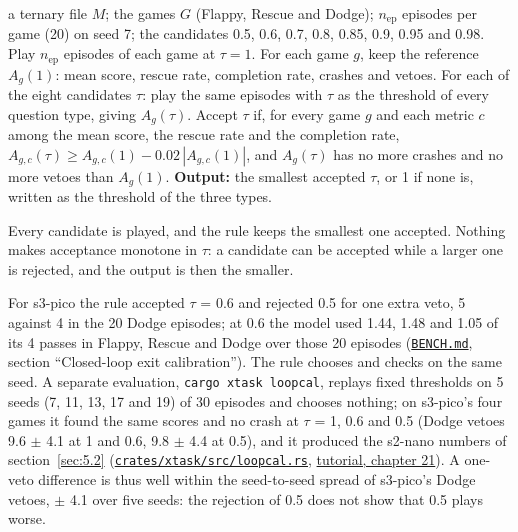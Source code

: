 \documentclass[10pt]{article}
\begin{document}
\begin{algorithm}[htbp]
\caption{Closed-loop exit calibration as implemented.}\label{alg:2}
\begin{algorithmic}[1]
\Require a ternary file $M$; the games $G$ (Flappy, Rescue and Dodge); $n_{\mathrm{ep}}$ episodes per game (20) on seed 7; the candidates 0.5, 0.6, 0.7, 0.8, 0.85, 0.9, 0.95 and 0.98.
\State Play $n_{\mathrm{ep}}$ episodes of each game at $\tau = 1$. For each game $g$, keep the reference $A_g(1)$: mean score, rescue rate, completion rate, crashes and vetoes.
\State For each of the eight candidates $\tau$: play the same episodes with $\tau$ as the threshold of every question type, giving $A_g(\tau)$.
\State Accept $\tau$ if, for every game $g$ and each metric $c$ among the mean score, the rescue rate and the completion rate, $A_{g,c}(\tau) \geq A_{g,c}(1) - 0.02\,|A_{g,c}(1)|$, and $A_g(\tau)$ has no more crashes and no more vetoes than $A_g(1)$.
\State \textbf{Output:} the smallest accepted $\tau$, or 1 if none is, written as the threshold of the three types.
\end{algorithmic}
\end{algorithm}

Every candidate is played, and the rule keeps the smallest one accepted. Nothing makes acceptance monotone in $\tau$: a candidate can be accepted while a larger one is rejected, and the output is then the smaller.

For s3-pico the rule accepted $\tau$ = 0.6 and rejected 0.5 for one extra veto, 5 against 4 in the 20 Dodge episodes; at 0.6 the model used 1.44, 1.48 and 1.05 of its 4 passes in Flappy, Rescue and Dodge over those 20 episodes (\href{https://github.com/maxgfr/skycmd/blob/main/BENCH.md}{\texttt{BENCH.md}}, section ``Closed-loop exit calibration''). The rule chooses and checks on the same seed. A separate evaluation, \texttt{cargo xtask loopcal}, replays fixed thresholds on 5 seeds (7, 11, 13, 17 and 19) of 30 episodes and chooses nothing; on s3-pico's four games it found the same scores and no crash at $\tau$ = 1, 0.6 and 0.5 (Dodge vetoes 9.6 $\pm$ 4.1 at 1 and 0.6, 9.8 $\pm$ 4.4 at 0.5), and it produced the s2-nano numbers of section~\ref{sec:5.2} (\href{https://github.com/maxgfr/skycmd/blob/main/crates/xtask/src/loopcal.rs}{\texttt{crates/\allowbreak{}xtask/\allowbreak{}src/\allowbreak{}loopcal.rs}}, \href{https://maxgfr.github.io/skycmd/tutorial/21-s3-recursive-tiny}{tutorial, chapter 21}). A one-veto difference is thus well within the seed-to-seed spread of s3-pico's Dodge vetoes, $\pm$ 4.1 over five seeds: the rejection of 0.5 does not show that 0.5 plays worse.
\end{document}
